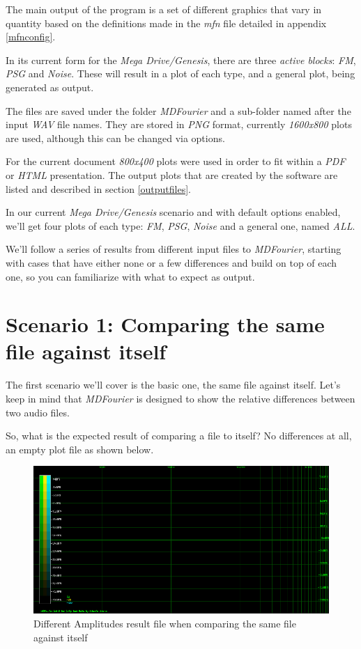 \documentclass[10pt,a4paper]{report}
\begin{document}
The main output of the program is a set of different graphics that vary in quantity based on the definitions made in the \textit{mfn} file detailed in appendix \ref{mfnconfig}.

In its current form for the \textit{Mega Drive/Genesis}, there are three \textit{active blocks}: \textit{FM}, \textit{PSG} and \textit{Noise}. These will result in a plot of each type, and a general plot, being generated as output.

The files are saved under the folder \textit{MDFourier} and a sub-folder named after the input \textit{WAV} file names. They are stored in \textit{PNG} format, currently \textit{1600x800} plots are used, although this can be changed via options. 

For the current document \textit{800x400} plots were used in order to fit within a \textit{PDF} or \textit{HTML} presentation. The output plots that are created by the software are listed and described in section \ref{outputfiles}.

In our current \textit{Mega Drive/Genesis} scenario and with default options enabled, we'll get four plots of each type: \textit{FM}, \textit{PSG}, \textit{Noise} and a general one, named \textit{ALL}.

We'll follow a series of results from different input files to \textit{MDFourier}, starting with cases that have either none or a few differences and build on top of each one, so you can familiarize with what to expect as output.

\section{Scenario 1: Comparing the same file against itself}

The first scenario we'll cover is the basic one, the same file against itself. Let's keep in mind that \textit{MDFourier} is designed to show the relative differences between two audio files.

So, what is the expected result of comparing a file to itself? No differences at all, an empty plot file as shown below.

\begin{figure}[H]
	\centering
	\includegraphics[width=1.0\linewidth]{plots/Plot1-SameFile.png}
	\caption[Same file compared]{Different Amplitudes result file when comparing the same file against itself}
	\label{fig:plot1-samefile}
\end{figure}
\end{document}
